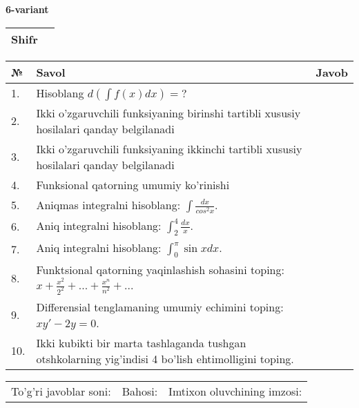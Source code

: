 \documentclass{article}
\begin{document}
  \egroup
  
  \newpage
  
  
  \textbf{6-variant}\\
  
  \bgroup
  \def\arraystretch{1.6} %
  
  \begin{tabular}{|m{5.7cm}|m{9.5cm}|}
  \hline
  Shifr & \\
  \hline
  \end{tabular}
  
  \vspace{1cm}
  
  \begin{tabular}{|m{0.7cm}|m{10cm}|m{4cm}|}
  \hline
  № & Savol & Javob \\
  \hline
  1. & Hisoblang \(d\left( \int {f(x)dx} \right) = ?\) &  \\
  \hline
  2. & Ikki o'zgaruvchili funksiyaning birinshi tartibli xususiy hosilalari qanday belgilanadi &  \\
  \hline
  3. & Ikki o'zgaruvchili funksiyaning ikkinchi tartibli xususiy hosilalari qanday belgilanadi &  \\
  \hline
  4. & Funksional qatorning umumiy ko'rinishi &  \\
  \hline
  5. & Aniqmas integralni hisoblang: \(\int \frac{dx}{cos^{2}x}\). &  \\
  \hline
  6. & Aniq integralni hisoblang: \(\int_{2}^{4}\frac{dx}{x}\). &  \\
  \hline
  7. & Aniq integralni hisoblang: \(\int_{0}^{\pi}{\sin xdx}\). &  \\
  \hline
  8. & Funktsional qatorning yaqinlashish sohasini toping: \(x + \frac{x^{2}}{2^{2}} + ... + \frac{x^{n}}{n^{2}} + ...\) &  \\
  \hline
  9. & Differensial tenglamaning umumiy echimini toping: \(xy' - 2y = 0\). &  \\
  \hline
  10. & Ikki kubikti bir marta tashlaganda tushgan otshkolarning yig'indisi 4 bo'lish ehtimolligini toping. &  \\
  \hline
  \end{tabular}
  
  \vspace{1cm}
  
  \begin{tabular}{lll}
  To'g'ri javoblar soni: \underline{\hspace{1.5cm}} & 
  Bahosi: \underline{\hspace{1.5cm}} & 
  Imtixon oluvchining imzosi: \underline{\hspace{2cm}} \\
  \end{tabular}
  
\end{document}
